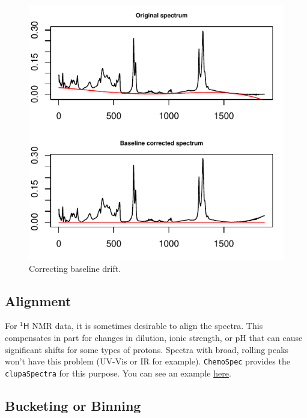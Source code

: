 \documentclass[letter,10pt,twocolumn,twoside,printwatermark=false]{pinp}
\begin{document}
\begin{figure}

{\centering \includegraphics{ChemoSpec2_files/figure-latex/Chunk10b-1} 

}

\caption{\label{baseline}Correcting baseline drift.}\label{fig:Chunk10b}
\end{figure}

\hypertarget{alignment}{%
\subsection{Alignment}\label{alignment}}

For \(\mathsf{^{1}H}\) NMR data, it is sometimes desirable to align the
spectra. This compensates in part for changes in dilution, ionic
strength, or pH that can cause significant shifts for some types of
protons. Spectra with broad, rolling peaks won't have this problem
(UV-Vis or IR for example). \texttt{ChemoSpec} provides the
\texttt{clupaSpectra} for this purpose. You can see an example
\href{http://www.validnmr.com/w/index.php?title=Chemometrics}{here}.

\hypertarget{bucketing-or-binning}{%
\subsection{Bucketing or Binning}\label{bucketing-or-binning}}
\end{document}
